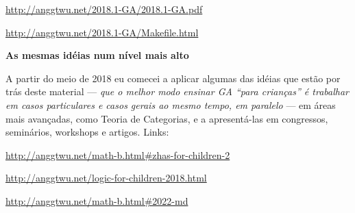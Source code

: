 \documentclass[oneside]{book}
\begin{document}
\url{http://anggtwu.net/2018.1-GA/2018.1-GA.pdf}

\url{http://anggtwu.net/2018.1-GA/Makefile.html}


\bsk
\bsk
\bsk



{\bf As mesmas idéias num nível mais alto}

A partir do meio de 2018 eu comecei a aplicar algumas das idéias que
estão por trás deste material --- {\sl que o melhor modo ensinar GA
  ``para crianças'' é trabalhar em casos particulares e casos gerais
  ao mesmo tempo, em paralelo} --- em áreas mais avançadas, como
Teoria de Categorias, e a apresentá-las em congressos, seminários,
workshops e artigos. Links:

\msk

\url{http://anggtwu.net/math-b.html\#zhas-for-children-2}

\url{http://anggtwu.net/logic-for-children-2018.html}

\url{http://anggtwu.net/math-b.html\#2022-md}




% 
% 
% 
% 
% 
\end{document}
